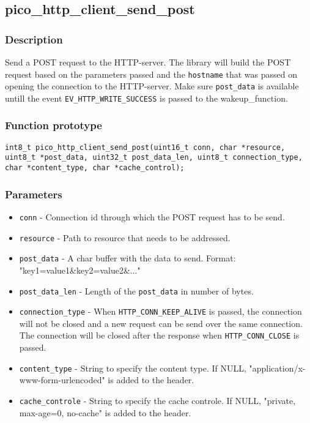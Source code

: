 
\subsection{pico\_http\_client\_send\_post}

\subsubsection*{Description}
Send a POST request to the HTTP-server. The library will build the POST request based on the parameters passed and the \texttt{hostname} that was passed on opening the connection to the HTTP-server. Make sure \texttt{post\_data} is available untill the event \texttt{EV\_HTTP\_WRITE\_SUCCESS} is passed to the wakeup\_function.

\subsubsection*{Function prototype}
\texttt{int8\_t pico\_http\_client\_send\_post(uint16\_t conn, char *resource, uint8\_t *post\_data, uint32\_t post\_data\_len, uint8\_t connection\_type, char *content\_type, char *cache\_control);}

\subsubsection*{Parameters}
\begin{itemize}[noitemsep]
\item \texttt{conn} - Connection id through which the POST request has to be send.
\item \texttt{resource} - Path to resource that needs to be addressed.
\item \texttt{post\_data} - A char buffer with the data to send. Format: "key1=value1\&key2=value2\&..."
\item \texttt{post\_data\_len} - Length of the \texttt{post\_data} in number of bytes.
\item \texttt{connection\_type} - When \texttt{HTTP\_CONN\_KEEP\_ALIVE} is passed, the connection will not be closed and a new request can be send over the same connection. The connection will be closed after the response when \texttt{HTTP\_CONN\_CLOSE} is passed.
\item \texttt{content\_type} - String to specify the content type. If NULL, "application/x-www-form-urlencoded" is added to the header.
\item \texttt{cache\_controle} - String to specify the cache controle. If NULL, "private, max-age=0, no-cache" is added to the header.
\end{itemize}
